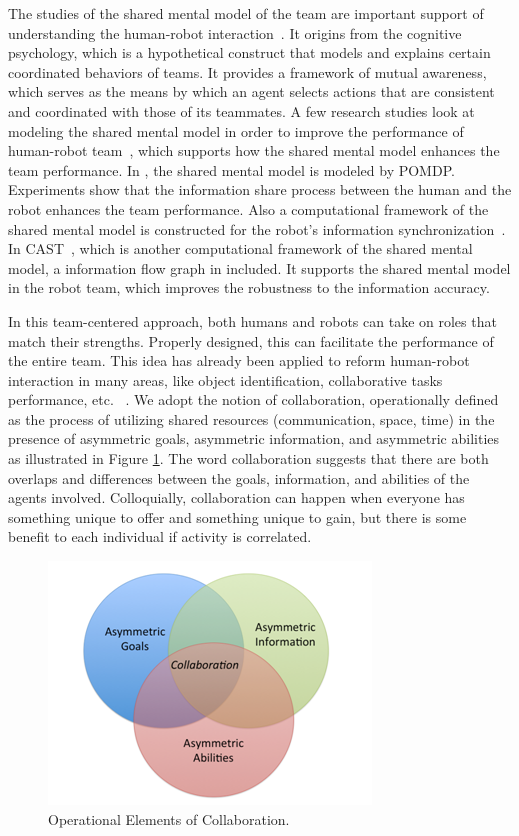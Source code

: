 \documentclass[phd]{byuprop}
\begin{document}
The studies of the shared mental model of the team are important support of understanding the human-robot interaction~\cite{FSS149109}.
It origins from the cognitive psychology, which is a hypothetical construct that models and explains certain coordinated behaviors of teams.
It provides a framework of mutual awareness, which serves as the means by which an agent selects actions that are consistent and coordinated with those of its teammates.
A few research studies look at modeling the shared mental model in order to improve the performance of human-robot team~\cite{nikolaidis2012human,Yen_implementingshared,FSS149109,Jonker:2010:SMM:2018118.2018128,Neerincx2011,Mathieu2000,Kennedy2007}, which supports how the shared mental model enhances the team performance.
In \cite{nikolaidis2012human}, the shared mental model is modeled by POMDP. 
Experiments show that the information share process between the human and the robot enhances the team performance.
Also a computational framework of the shared mental model is constructed for the robot's information synchronization~\cite{FSS149109}.
In CAST~\cite{FSS149109}, which is another computational framework of the shared mental model, a information flow graph in included. 
It supports the shared mental model in the robot team, which improves the robustness to the information accuracy.

In this team-centered approach, both humans and robots can take on roles that match their strengths. Properly designed, this can facilitate the performance of the entire team.
This idea has already been applied to reform human-robot interaction in many areas, like object identification, collaborative tasks performance, etc. ~\cite{Hoffman2004}. 
We adopt the notion of collaboration, operationally defined as the process of utilizing shared resources (communication, space, time) in the presence of asymmetric goals, asymmetric information, and asymmetric abilities as illustrated in Figure \ref{fig:collaboration}. 
The word collaboration suggests that there are both overlaps and differences between the goals, information, and abilities of the agents involved. Colloquially, collaboration can happen when everyone has something unique to offer and something unique to gain, but there is some benefit to each individual if activity is correlated.

\begin{figure}[hbtp]
\centering
\includegraphics[width=0.4\linewidth]{./fig/collaboration.png}
\caption{Operational Elements of Collaboration.}
\label{fig:collaboration}
\end{figure}
\end{document}
